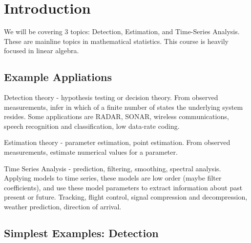 \documentclass[a4paper]{article}
\begin{document}
\section*{Introduction}
We will be covering 3 topics: Detection, Estimation, and Time-Series Analysis. These are mainline topics in mathematical statistics. This course is heavily focused in linear algebra. 
\subsection*{Example Appliations}
Detection theory - hypothesis testing or decision theory. From observed measurements, infer in which of a finite number of states the underlying system resides. Some applications are RADAR, SONAR, wireless communications, speech recognition and classification, low data-rate coding. 

Estimation theory - parameter estimation, point estimation. From observed measurements, estimate numerical values for a parameter.

Time Series Analysis - prediction, filtering, smoothing, spectral analysis. Applying models to time series, these models are low order (maybe filter coefficients), and use these model parameters to extract information about past present or future. Tracking, flight control, signal compression and decompression, weather prediction, direction of arrival. 

\subsection*{Simplest Examples: Detection}
\end{document}
